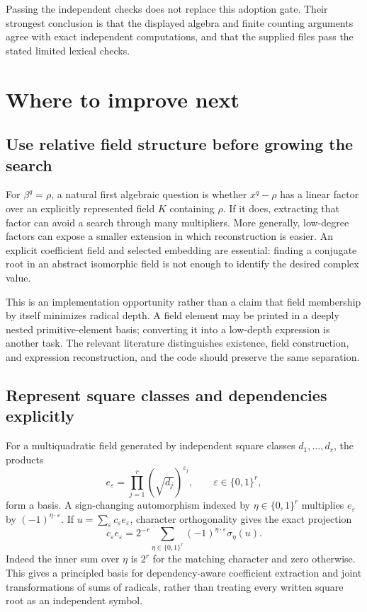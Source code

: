 \documentclass[11pt,letterpaper]{article}
\theoremstyle{definition}
\theoremstyle{remark}
\begin{document}
Passing the independent checks does not replace this adoption gate. Their strongest conclusion is that the displayed algebra and finite counting arguments agree with exact independent computations, and that the supplied files pass the stated limited lexical checks.

\section{Where to improve next}\label{sec:next}

\subsection{Use relative field structure before growing the search}

For $\beta^q=\rho$, a natural first algebraic question is whether $x^q-\rho$ has a linear factor over an explicitly represented field $K$ containing $\rho$. If it does, extracting that factor can avoid a search through many multipliers. More generally, low-degree factors can expose a smaller extension in which reconstruction is easier. An explicit coefficient field and selected embedding are essential: finding a conjugate root in an abstract isomorphic field is not enough to identify the desired complex value.

This is an implementation opportunity rather than a claim that field membership by itself minimizes radical depth. A field element may be printed in a deeply nested primitive-element basis; converting it into a low-depth expression is another task. The relevant literature distinguishes existence, field construction, and expression reconstruction, and the code should preserve the same separation.\cite{bfht,landau,report}

\subsection{Represent square classes and dependencies explicitly}

For a multiquadratic field generated by independent square classes $d_1,\ldots,d_r$, the products
\[
 e_{\varepsilon}=\prod_{j=1}^r(\sqrt{d_j})^{\varepsilon_j},
 \qquad \varepsilon\in\{0,1\}^r,
\]
form a basis. A sign-changing automorphism indexed by $\eta\in\{0,1\}^r$ multiplies $e_\varepsilon$ by $(-1)^{\eta\cdot\varepsilon}$. If $u=\sum_\varepsilon c_\varepsilon e_\varepsilon$, character orthogonality gives the exact projection
\[
 c_\varepsilon e_\varepsilon
 =2^{-r}\sum_{\eta\in\{0,1\}^r}
 (-1)^{\eta\cdot\varepsilon}\sigma_\eta(u).
\]
Indeed the inner sum over $\eta$ is $2^r$ for the matching character and zero otherwise. This gives a principled basis for dependency-aware coefficient extraction and joint transformations of sums of radicals, rather than treating every written square root as an independent symbol.
\end{document}
